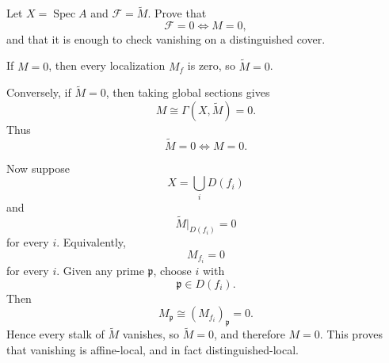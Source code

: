 \begin{problem}\label{prob:vi33-10}
Let \(X=\operatorname{Spec}A\) and \(\mathcal F=\widetilde M\). Prove that
\[
\mathcal F=0\iff M=0,
\]
and that it is enough to check vanishing on a distinguished cover.
\end{problem}

\ifdefined\FullProblemDossiers
\begin{solution}
If \(M=0\), then every localization \(M_f\) is zero, so \(\widetilde M=0\).

Conversely, if \(\widetilde M=0\), then taking global sections gives
\[
M\cong\Gamma(X,\widetilde M)=0.
\]
Thus
\[
\boxed{\widetilde M=0\iff M=0}.
\]

Now suppose
\[
X=\bigcup_iD(f_i)
\]
and
\[
\widetilde M|_{D(f_i)}=0
\]
for every \(i\). Equivalently,
\[
M_{f_i}=0
\]
for every \(i\).  Given any prime \(\mathfrak p\), choose \(i\) with
\[
\mathfrak p\in D(f_i).
\]
Then
\[
M_{\mathfrak p}
\cong
(M_{f_i})_{\mathfrak p}
=
0.
\]
Hence every stalk of \(\widetilde M\) vanishes, so \(\widetilde M=0\), and therefore \(M=0\).  This proves that
vanishing is affine-local, and in fact distinguished-local.
\end{solution}
\fi
